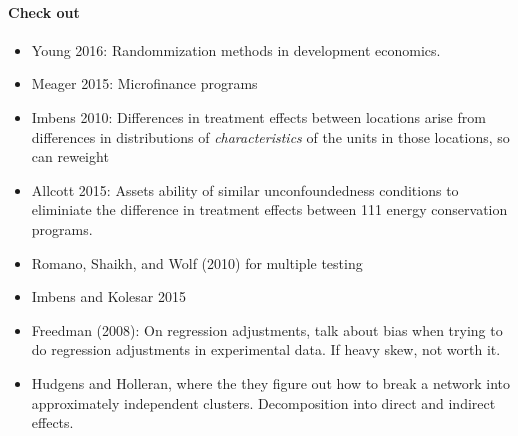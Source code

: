 \documentclass[12pt]{article}
\theoremstyle{plain}
\theoremstyle{definition}
\theoremstyle{remark}
\begin{document}
\paragraph{Check out}
\begin{itemize}
  \item Young 2016: Randommization methods in development economics.
  \item Meager 2015: Microfinance programs
  \item Imbens 2010: Differences in treatment effects between locations
    arise from differences in distributions of \emph{characteristics} of
    the units in those locations, so can reweight
  \item Allcott 2015: Assets ability of similar unconfoundedness
    conditions to eliminiate the difference in treatment effects between
    111 energy conservation programs.
  \item Romano, Shaikh, and Wolf (2010) for multiple testing
  \item Imbens and Kolesar 2015
  \item Freedman (2008): On regression adjustments, talk about bias
    when trying to do regression adjustments in experimental data. If
    heavy skew, not worth it.
  \item
    Hudgens and Holleran,
    where the they figure out how to break a network into approximately
    independent clusters.
    Decomposition into direct and indirect effects.
\end{itemize}
\end{document}
